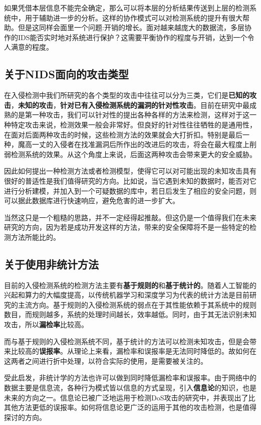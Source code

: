 \documentclass[12pt]{article} %
\begin{document}
如果凭借本层信息不能完全确定，那么可以将本层的分析结果传送到上层的检测系统中，用于辅助进一步的分析。这样的协作模式可以对检测系统的提升有很大帮助。但是这同样会面里一个问题:开销的增长。面对越来越庞大的数据流，多层协作的IDS能否实时地对系统进行保护？这需要平衡协作的程度与开销，达到一个令人满意的程度。

\subsection{关于NIDS面向的攻击类型}
\label{attack}

在入侵检测中我们所研究的各个类型的攻击中往往可以分为三类，它们是\textbf{已知的攻击}，\textbf{未知的攻击}，\textbf{针对已有入侵检测系统的漏洞的针对性攻击}。目前在研究中最成熟的是第一种攻击，我们可以针对性的提出各种各样的方法来检测，这样对于这一种特定攻击来说，检测效果一般会非常好。但良好的针对性往往牺牲的是通用性，在面对后面两种攻击的时候，这些检测方法的效果就会大打折扣。特别是最后一种，魔高一丈的入侵者在找准漏洞后所作出的改进后的攻击，将会在最大程度上削弱检测系统的效果。从这个角度上来说，后面这两种攻击会带来更大的安全威胁。

因此如何提出一种检测方法或者检测模型，使得它可以对可能出现的未知攻击具有很好的普适性是我们值得研究的方向。比如说，当它遇到未知的数据时，能否对它进行分析建模，并加入到一个可疑数据的库中，若日后发生了相应的安全问题，则可以据此数据库进行快速响应，避免危害的进一步扩大。

当然这只是一个粗糙的思路，并不一定经得起推敲。但这仍是一个值得我们在未来研究的方向，因为若是成功开发这样的方法，带来的安全保障将不是一些特定的检测方法所能比的。

\subsection{关于使用非统计方法}
\label{nonprob}

目前的入侵检测系统的检测方法主要有\textbf{基于规则的}和\textbf{基于统计的}。随着人工智能的兴起和算力的大幅度提高，以传统机器学习和深度学习为代表的统计方法是目前研究的主流方向。基于规则的入侵检测系统的弱点在于其性能依赖于其系统中的规则数目，而规则越多，系统的处理时间越长，效率越低。同时，由于其无法识别未知攻击，所以\textbf{漏检率}比较高。

而与基于规则的入侵检测系统不同，基于统计的方法可以检测未知攻击，但是会带来比较高的\textbf{误报率}。从理论上来看，漏检率和误报率是无法同时降低的。故如何在这两者之间进行折中处理，以符合实际的使用，是需要被关注的。

受此启发，非统计学的方法也许可以做到同时降低漏检率和误报率。由于网络中的数据主要是信息流，各种行为模式皆以信息的方式呈现，引入\textbf{信息论}的知识，也是未来的方向之一。信息论已被广泛地运用于检测DoS攻击的研究中，并表现出了比其他方法更低的误报率。如何将信息论更广泛的运用于其他的攻击检测，也是值得探讨的方向。
\end{document}
